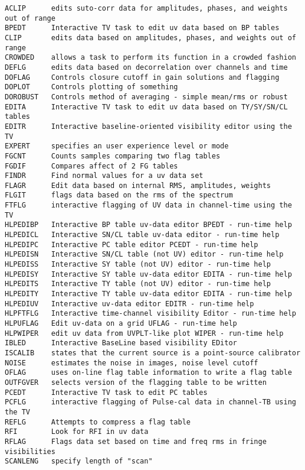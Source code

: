 \vskip 0.5pt
\bbve\begin{verbatim}
ACLIP      edits suto-corr data for amplitudes, phases, and weights out of range
BPEDT      Interactive TV task to edit uv data based on BP tables
CLIP       edits data based on amplitudes, phases, and weights out of range
CROWDED    allows a task to perform its function in a crowded fashion
DEFLG      edits data based on decorrelation over channels and time
DOFLAG     Controls closure cutoff in gain solutions and flagging
DOPLOT     Controls plotting of something
DOROBUST   Controls method of averaging - simple mean/rms or robust
EDITA      Interactive TV task to edit uv data based on TY/SY/SN/CL tables
EDITR      Interactive baseline-oriented visibility editor using the TV
EXPERT     specifies an user experience level or mode
FGCNT      Counts samples comparing two flag tables
FGDIF      Compares affect of 2 FG tables
FINDR      Find normal values for a uv data set
FLAGR      Edit data based on internal RMS, amplitudes, weights
FLGIT      flags data based on the rms of the spectrum
FTFLG      interactive flagging of UV data in channel-time using the TV
HLPEDIBP   Interactive BP table uv-data editor BPEDT - run-time help
HLPEDICL   Interactive SN/CL table uv-data editor - run-time help
HLPEDIPC   Interactive PC table editor PCEDT - run-time help
HLPEDISN   Interactive SN/CL table (not UV) editor - run-time help
HLPEDISS   Interactive SY table (not UV) editor - run-time help
HLPEDISY   Interactive SY table uv-data editor EDITA - run-time help
HLPEDITS   Interactive TY table (not UV) editor - run-time help
HLPEDITY   Interactive TY table uv-data editor EDITA - run-time help
HLPEDIUV   Interactive uv-data editor EDITR - run-time help
HLPFTFLG   Interactive time-channel visibility Editor - run-time help
HLPUFLAG   Edit uv-data on a grid UFLAG - run-time help
HLPWIPER   edit uv data from UVPLT-like plot WIPER - run-time help
IBLED      Interactive BaseLine based visibility EDitor
ISCALIB    states that the current source is a point-source calibrator
NOISE      estimates the noise in images, noise level cutoff
OFLAG      uses on-line flag table information to write a flag table
OUTFGVER   selects version of the flagging table to be written
PCEDT      Interactive TV task to edit PC tables
PCFLG      interactive flagging of Pulse-cal data in channel-TB using the TV
REFLG      Attempts to compress a flag table
RFI        Look for RFI in uv data
RFLAG      Flags data set based on time and freq rms in fringe visibilities
SCANLENG   specify length of "scan"

\end{verbatim}
